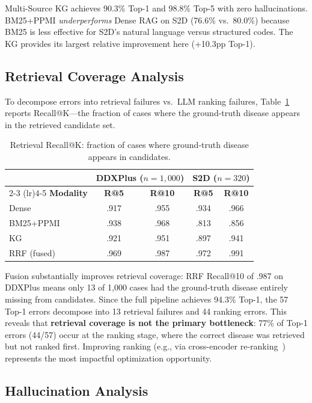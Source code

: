 \documentclass[runningheads]{llncs}
\begin{document}
Multi-Source KG achieves 90.3\% Top-1 and 98.8\% Top-5 with zero hallucinations. BM25+PPMI \emph{underperforms} Dense RAG on S2D (76.6\% vs.\ 80.0\%) because BM25 is less effective for S2D's natural language versus structured codes. The KG provides its largest relative improvement here (+10.3pp Top-1).

\subsection{Retrieval Coverage Analysis}
\label{sec:recall}

To decompose errors into retrieval failures vs.\ LLM ranking failures, Table~\ref{tab:recall} reports Recall@K---the fraction of cases where the ground-truth disease appears in the retrieved candidate set.

\begin{table}[t]
\centering
\caption{Retrieval Recall@K: fraction of cases where ground-truth disease appears in candidates.}
\label{tab:recall}
\begin{tabular}{lcccc}
\toprule
& \multicolumn{2}{c}{\textbf{DDXPlus} ($n{=}1{,}000$)} & \multicolumn{2}{c}{\textbf{S2D} ($n{=}320$)} \\
\cmidrule(lr){2-3} \cmidrule(lr){4-5}
\textbf{Modality} & \textbf{R@5} & \textbf{R@10} & \textbf{R@5} & \textbf{R@10} \\
\midrule
Dense       & .917 & .955 & .934 & .966 \\
BM25+PPMI   & .938 & .968 & .813 & .856 \\
KG          & .921 & .951 & .897 & .941 \\
RRF (fused) & .969 & .987 & .972 & .991 \\
\bottomrule
\end{tabular}
\end{table}

Fusion substantially improves retrieval coverage: RRF Recall@10 of .987 on DDXPlus means only 13 of 1,000 cases had the ground-truth disease entirely missing from candidates. Since the full pipeline achieves 94.3\% Top-1, the 57 Top-1 errors decompose into 13 retrieval failures and 44 ranking errors. This reveals that \textbf{retrieval coverage is not the primary bottleneck}: 77\% of Top-1 errors (44/57) occur at the ranking stage, where the correct disease was retrieved but not ranked first. Improving ranking (e.g., via cross-encoder re-ranking~\cite{nogueira2020passage}) represents the most impactful optimization opportunity.

\subsection{Hallucination Analysis}
\label{sec:hallucination}
\end{document}
